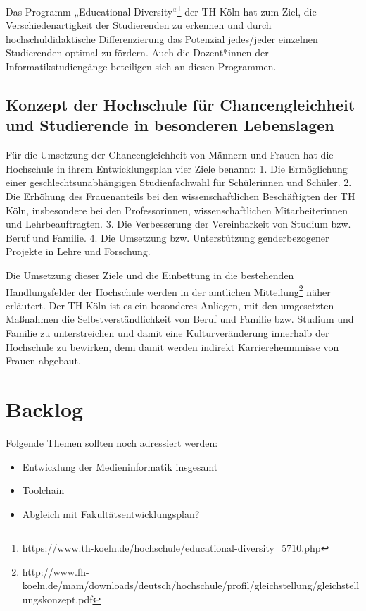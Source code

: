 Das Programm „Educational Diversity``\footnote{https://www.th-koeln.de/hochschule/educational-diversity\_5710.php}
der TH Köln hat zum Ziel, die Verschiedenartigkeit der Studierenden zu
erkennen und durch hochschuldidaktische Differenzierung das Potenzial
jedes/jeder einzelnen Studierenden optimal zu fördern. Auch die
Dozent*innen der Informatikstudiengänge beteiligen sich an diesen
Programmen.

\section{Konzept der Hochschule für Chancengleichheit und Studierende
in besonderen
Lebenslagen}\label{konzept-der-hochschule-fuxfcr-chancengleichheit-und-studierende-in-besonderen-lebenslagen}

Für die Umsetzung der Chancengleichheit von Männern und Frauen hat die
Hochschule in ihrem Entwicklungsplan vier Ziele benannt: 1. Die
Ermöglichung einer geschlechtsunabhängigen Studienfachwahl für
Schülerinnen und Schüler. 2. Die Erhöhung des Frauenanteils bei den
wissenschaftlichen Beschäftigten der TH Köln, insbesondere bei den
Professorinnen, wissenschaftlichen Mitarbeiterinnen und
Lehrbeauftragten. 3. Die Verbesserung der Vereinbarkeit von Studium bzw.
Beruf und Familie. 4. Die Umsetzung bzw. Unterstützung genderbezogener
Projekte in Lehre und Forschung.

Die Umsetzung dieser Ziele und die Einbettung in die bestehenden
Handlungsfelder der Hochschule werden in der amtlichen
Mitteilung\footnote{http://www.fh-koeln.de/mam/downloads/deutsch/hochschule/profil/gleichstellung/gleichstellungskonzept.pdf}
näher erläutert. Der TH Köln ist es ein besonderes Anliegen, mit den
umgesetzten Maßnahmen die Selbstverständlichkeit von Beruf und Familie
bzw. Studium und Familie zu unterstreichen und damit eine
Kulturveränderung innerhalb der Hochschule zu bewirken, denn damit
werden indirekt Karrierehemmnisse von Frauen abgebaut.

\chapter{Backlog}\label{backlog}

Folgende Themen sollten noch adressiert werden:

\begin{itemize}
\tightlist
\item
  Entwicklung der Medieninformatik insgesamt
\item
  Toolchain
\item
  Abgleich mit Fakultätsentwicklungsplan?
\end{itemize}

